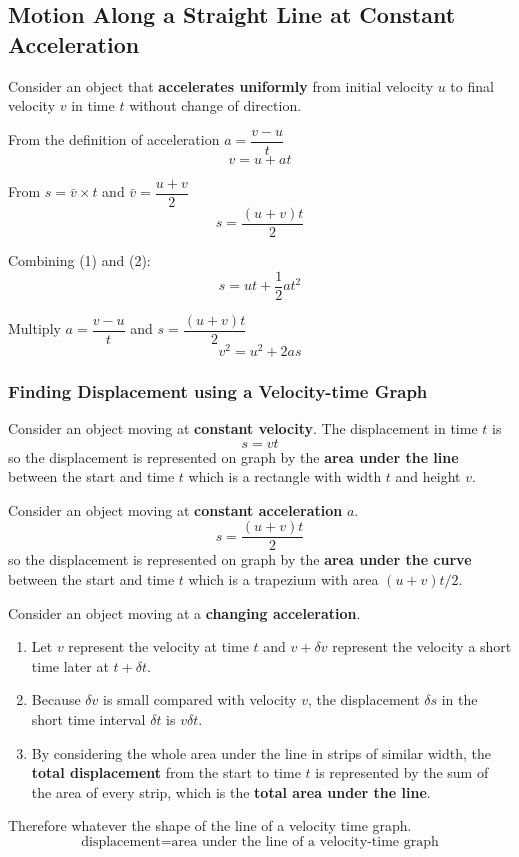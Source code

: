 \subsection{Motion Along a Straight Line at Constant Acceleration}

Consider an object that \textbf{accelerates uniformly} from initial velocity $u$ to final velocity $v$ in time $t$ without change of direction.

From the definition of acceleration $a=\dfrac{v-u}{t}$
\begin{equation}
    v=u+at
\end{equation}

From $s=\bar{v}\times t$ and $\bar{v}=\dfrac{u+v}{2}$
\begin{equation}
    s=\frac{(u+v)t}{2}
\end{equation}

Combining (1) and (2):
\begin{equation}
    s=ut+\frac{1}{2}at^2
\end{equation}

Multiply $a=\dfrac{v-u}{t}$ and $s=\dfrac{(u+v)t}{2}$
\begin{equation}
    v^2=u^2+2as
\end{equation}

\subsubsection*{Finding Displacement using a Velocity-time Graph}

Consider an object moving at \textbf{constant velocity}. The displacement in time $t$ is
$$s=vt$$
so the displacement is represented on graph by the \textbf{area under the line} between the start and time $t$ which is a rectangle with width $t$ and height $v$.

Consider an object moving at \textbf{constant acceleration} $a$.
$$s=\frac{(u+v)t}{2}$$
so the displacement is represented on graph by the \textbf{area under the curve} between the start and time $t$ which is a trapezium with area $(u+v)t/2$.

Consider an object moving at a \textbf{changing acceleration}.
\begin{enumerate}
    \item Let $v$ represent the velocity at time $t$ and $v+\delta v$ represent the velocity a short time later at $t+\delta t$.
    \item Because $\delta v$ is small compared with velocity $v$, the displacement $\delta s$ in the short time interval $\delta t$ is $v\delta t$.
    \item By considering the whole area under the line in strips of similar width, the \textbf{total displacement} from the start to time $t$ is represented by the sum of the area of every strip, which is the \textbf{total area under the line}.
\end{enumerate}

Therefore whatever the shape of the line of a velocity time graph.
$$\text{displacement}=\text{area under the line of a velocity-time graph}$$
